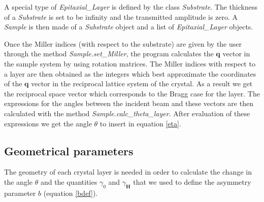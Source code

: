 \documentclass[12pt,oneside,notitlepage,abstracton,a4paper]{scrartcl}
\begin{document}
A special type of \textit{Epitaxial\_Layer} is defined by the class \textit{Substrate}. The thickness of a \textit{Substrate} is set to be infinity and the transmitted amplitude is zero. A \textit{Sample} is then made of a \textit{Substrate} object and a list of \textit{Epitaxial\_Layer} objects.

Once the Miller indices (with respect to the substrate) are given by the user through the method \textit{Sample.set\_Miller}, the program calculates the $\mathbf{q}$ vector in the sample system by using rotation matrices. The Miller indices with respect to a layer are then obtained as the integers which best approximate the coordinates of the $\mathbf{q}$ vector in the reciprocal lattice system of the crystal. As a result we get the reciprocal space vector which corresponds to the Bragg case for the layer. The expressions for the angles between the incident beam and these vectors are then calculated with the method \textit{Sample.calc\_theta\_layer}. After evaluation of these expressions we get the angle $\theta$ to insert in equation \ref{eta}.


\subsection{Geometrical parameters}\label{geom}

The geometry of each crystal layer is needed in order to calculate the change in the angle $\theta$ and the quantities $\gamma_0$ and $\gamma_\mathbf{H}$ that we used to define the asymmetry parameter $b$ (equation \ref{bdef}).
\end{document}
